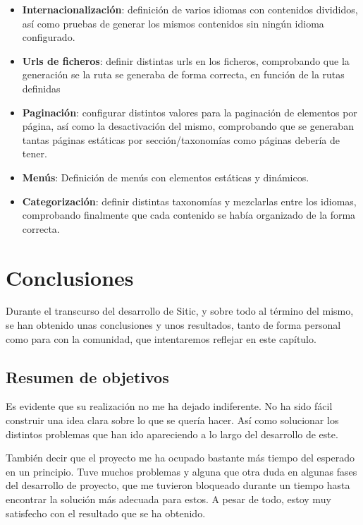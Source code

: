 \documentclass[a4paper,12pt]{article}
\begin{document}
\begin{itemize}
\item \textbf{Internacionalización}: definición de varios idiomas con contenidos divididos, así como pruebas de generar
los mismos contenidos sin ningún idioma configurado.
\item \textbf{Urls de ficheros}: definir distintas urls en los ficheros, comprobando que la generación se la ruta
se generaba de forma correcta, en función de la rutas definidas
\item \textbf{Paginación}: configurar distintos valores para la paginación de elementos por página, así como la desactivación
del mismo, comprobando que se generaban tantas páginas estáticas por sección/taxonomías como páginas debería de tener.
\item \textbf{Menús}: Definición de menús con elementos estáticas y dinámicos.
\item \textbf{Categorización}: definir distintas taxonomías y mezclarlas entre los idiomas, comprobando finalmente que cada
contenido se había organizado de la forma correcta.
\end{itemize}



\section{Conclusiones}

Durante el transcurso del desarrollo de Sitic, y sobre todo al término del mismo,
se han obtenido unas conclusiones y unos resultados, tanto de forma personal
como para con la comunidad, que intentaremos reflejar en este capítulo.

\subsection{Resumen de objetivos}

Es evidente que su realización no me ha dejado indiferente. No ha sido fácil construir una idea
clara sobre lo que se quería hacer. Así como solucionar los distintos problemas que han ido apareciendo
a lo largo del desarrollo de este.

También decir que el proyecto me ha ocupado bastante más tiempo del esperado en un principio. Tuve
muchos problemas y alguna que otra duda en algunas fases del desarrollo de proyecto, que me tuvieron
bloqueado durante un tiempo hasta encontrar la solución más adecuada para estos. A pesar de todo,
estoy muy satisfecho con el resultado que se ha obtenido.
\end{document}
